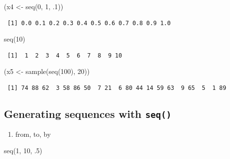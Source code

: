 \documentclass[
]{book}
\newenvironment{Shaded}{\begin{snugshade}}{\end{snugshade}}
\newcommand{\DecValTok}[1]{\textcolor[rgb]{0.00,0.00,0.81}{#1}}
\newcommand{\FunctionTok}[1]{\textcolor[rgb]{0.00,0.00,0.00}{#1}}
\newcommand{\NormalTok}[1]{#1}
\newcommand{\OtherTok}[1]{\textcolor[rgb]{0.56,0.35,0.01}{#1}}
\providecommand{\tightlist}{%
  \setlength{\itemsep}{0pt}\setlength{\parskip}{0pt}}
\begin{document}
\begin{Shaded}
\begin{Highlighting}[]
\NormalTok{(x4 }\OtherTok{\textless{}{-}} \FunctionTok{seq}\NormalTok{(}\DecValTok{0}\NormalTok{, }\DecValTok{1}\NormalTok{, .}\DecValTok{1}\NormalTok{))}
\end{Highlighting}
\end{Shaded}

\begin{verbatim}
 [1] 0.0 0.1 0.2 0.3 0.4 0.5 0.6 0.7 0.8 0.9 1.0
\end{verbatim}

\begin{Shaded}
\begin{Highlighting}[]
\FunctionTok{seq}\NormalTok{(}\DecValTok{10}\NormalTok{)}
\end{Highlighting}
\end{Shaded}

\begin{verbatim}
 [1]  1  2  3  4  5  6  7  8  9 10
\end{verbatim}

\begin{Shaded}
\begin{Highlighting}[]
\NormalTok{(x5 }\OtherTok{\textless{}{-}} \FunctionTok{sample}\NormalTok{(}\FunctionTok{seq}\NormalTok{(}\DecValTok{100}\NormalTok{), }\DecValTok{20}\NormalTok{))}
\end{Highlighting}
\end{Shaded}

\begin{verbatim}
 [1] 74 88 62  3 58 86 50  7 21  6 80 44 14 59 63  9 65  5  1 89
\end{verbatim}

\hypertarget{generating-sequences-with-seq}{%
\subsection{\texorpdfstring{Generating sequences with \texttt{seq()}}{Generating sequences with seq()}}\label{generating-sequences-with-seq}}

\begin{enumerate}
\def\labelenumi{\arabic{enumi}.}
\tightlist
\item
  from, to, by
\end{enumerate}

\begin{Shaded}
\begin{Highlighting}[]
\FunctionTok{seq}\NormalTok{(}\DecValTok{1}\NormalTok{, }\DecValTok{10}\NormalTok{, .}\DecValTok{5}\NormalTok{)}
\end{Highlighting}
\end{Shaded}
\end{document}

